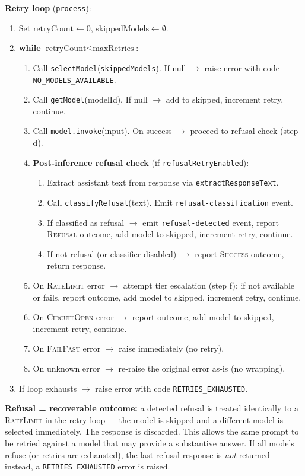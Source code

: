 \documentclass[10pt,letterpaper]{article}
\newcommand{\op}[1]{\textsc{#1}}
\newcommand{\fn}[1]{\texttt{#1}}
\newcommand{\fld}[1]{\texttt{#1}}
\begin{document}
\smallskip
\noindent\textbf{Retry loop} (\fn{process}):
\begin{enumerate}[nosep]
  \item Set $\text{retryCount} \gets 0$, $\text{skippedModels} \gets \emptyset$.
  \item \textbf{while} $\text{retryCount} \le \text{maxRetries}$:
  \begin{enumerate}[nosep,label=\alph*.]
    \item Call \fn{selectModel}(\fld{skippedModels}). If null $\to$ raise error with code \texttt{NO\_MODELS\_AVAILABLE}.
    \item Call \fn{getModel}(modelId). If null $\to$ add to skipped, increment retry, continue.
    \item Call \fn{model.invoke}(input). On success $\to$ proceed to refusal check (step d).
    \item \textbf{Post-inference refusal check} (if \fld{refusalRetryEnabled}):
    \begin{enumerate}[nosep,label=\roman*.]
      \item Extract assistant text from response via \fn{extractResponseText}.
      \item Call \fn{classifyRefusal}(text). Emit \texttt{refusal-classification} event.
      \item If classified as refusal $\to$ emit \texttt{refusal-detected} event, report \op{Refusal} outcome, add model to skipped, increment retry, continue.
      \item If not refusal (or classifier disabled) $\to$ report \op{Success} outcome, return response.
    \end{enumerate}
    \item On \op{RateLimit} error $\to$ attempt tier escalation (step f); if not available or fails, report outcome, add model to skipped, increment retry, continue.
    \item On \op{CircuitOpen} error $\to$ report outcome, add model to skipped, increment retry, continue.
    \item On \op{FailFast} error $\to$ raise immediately (no retry).
    \item On unknown error $\to$ re-raise the original error as-is (no wrapping).
  \end{enumerate}
  \item If loop exhausts $\to$ raise error with code \texttt{RETRIES\_EXHAUSTED}.
\end{enumerate}

\medskip
\noindent\textbf{Refusal = recoverable outcome:} a detected refusal is treated identically to a \op{RateLimit} in the retry loop --- the model is skipped and a different model is selected immediately. The response is discarded. This allows the same prompt to be retried against a model that may provide a substantive answer. If all models refuse (or retries are exhausted), the last refusal response is \emph{not} returned --- instead, a \texttt{RETRIES\_EXHAUSTED} error is raised.
\end{document}
